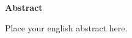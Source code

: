 %
%
\vspace*{2cm}

\begin{center}
    \textbf{Abstract}
\end{center}

\vspace*{1cm}

\noindent  Place your english abstract here. 
